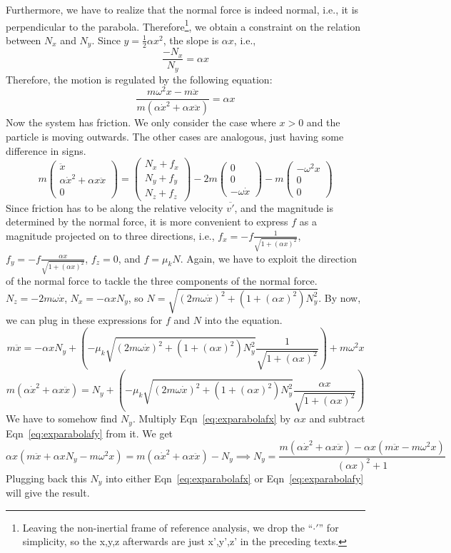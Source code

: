 \documentclass[a4paper,12pt,titlepage]{article}
\begin{document}
Furthermore, we have to realize that the normal force is indeed normal, i.e., it is perpendicular to the parabola. Therefore\footnote{Leaving the non-inertial frame of reference analysis, we drop the ``$\cdot'$'' for simplicity, so the x,y,z afterwards are just x',y',z' in the preceding texts.}, we obtain a constraint on the relation between $N_x$ and $N_y$. Since $y=\frac{1}{2}\alpha x^2$, the slope is $\alpha x$, i.e., \[\frac{-N_x}{N_y}=\alpha x\]
Therefore, the motion is regulated by the following equation:
\[
\frac{m\omega^2 x-m\ddot x}{m(\alpha\dot x^2+\alpha x\ddot x)}=\alpha x
\]
Now the system has friction. We only consider the case where $x>0$ and the particle is moving outwards. The other cases are analogous, just having some difference in signs.
\[m\left(\begin{matrix}\ddot x\\\alpha\dot x^2+\alpha x\ddot x\\0\end{matrix}\right)=\left(\begin{matrix}N_x+f_x\\N_y+f_y\\N_z+f_z\end{matrix}\right)-2m\left(\begin{matrix}0\\0\\-\omega\dot x\end{matrix}\right)-m\left(\begin{matrix}-\omega^2 x\\0\\0\end{matrix}\right)\]
Since friction has to be along the relative velocity $\overline{v'}$, and the magnitude is determined by the normal force, it is more convenient to express $f$ as a magnitude projected on to three directions, i.e., $f_x=-f\frac{1}{\sqrt{1+(\alpha x)^2}}$, $f_y=-f\frac{\alpha x}{\sqrt{1+(\alpha x)^2}}$, $f_z=0$, and $f=\mu_k N$.
Again, we have to exploit the direction of the normal force to tackle the three components of the normal force. $N_z=-2m\omega\dot x$, $N_x=-\alpha x N_y$, so $N=\sqrt{(2m\omega\dot x)^2+(1+(\alpha x)^2)N_y^2}$. By now, we can plug in these expressions for $f$ and $N$ into the equation.
\begin{equation}\label{eq:exparabolafx}
m\ddot x=-\alpha x N_y+(-\mu_k\sqrt{(2m\omega \dot x)^2+(1+(\alpha x)^2)N_y^2}\frac{1}{\sqrt{1+(\alpha x)^2}})+m\omega^2 x
\end{equation}
\begin{equation}\label{eq:exparabolafy}
m(\alpha\dot x^2+\alpha x\ddot x)=N_y+(-\mu_k \sqrt{(2m\omega\dot x)^2+(1+(\alpha x)^2)N_y^2}\frac{\alpha x}{\sqrt{1+(\alpha x)^2}})
\end{equation}
We have to somehow find $N_y$. Multiply Eqn~\ref{eq:exparabolafx} by $\alpha x$ and subtract Eqn~\ref{eq:exparabolafy} from it. We get
\[
\alpha x(m\ddot x+\alpha x N_y-m\omega^2 x)=m(\alpha \dot x^2+\alpha x\ddot x)-N_y\implies N_y=\frac{m(\alpha\dot x^2+\alpha x\ddot x)-\alpha x(m\ddot x-m\omega ^2 x)}{(\alpha x)^2+1}
\]
Plugging back this $N_y$ into either Eqn~\ref{eq:exparabolafx} or Eqn~\ref{eq:exparabolafy} will give the result.
\end{document}
